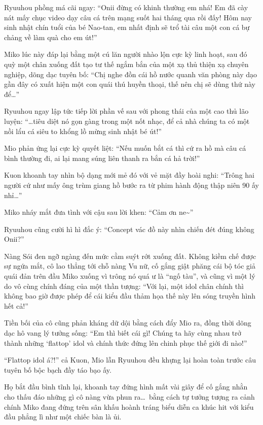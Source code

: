 \documentclass[../main.tex]{subfiles}
\begin{document}
Ryuuhou phồng má cãi ngay: ``Onii đừng có khinh thường em nhá! Em đã cày nát mấy chục video dạy câu cá trên mạng suốt hai tháng qua rồi đấy! Hôm nay sinh nhật chín tuổi của bé Nao-tan, em nhất định sẽ trổ tài câu một con cá bự chảng về làm quà cho em út!''

Miko lúc này đáp lại bằng một cú lăn người nhào lộn cực kỳ linh hoạt, sau đó quỳ một chân xuống đất tạo tư thế ngắm bắn của một xạ thủ thiện xạ chuyên nghiệp, dõng dạc tuyên bố: ``Chị nghe đồn cái hồ nước quanh văn phòng này dạo gần đây có xuất hiện một con quái thú huyền thoại, thế nên chị sẽ dùng thứ này để\dots''

Ryuuhou ngay lập tức tiếp lời phần vế sau với phong thái của một cao thủ lão luyện: ``\dots tiêu diệt nó gọn gàng trong một nốt nhạc, để cả nhà chúng ta có một nồi lẩu cá siêu to khổng lồ mừng sinh nhật bé út!''

Mio phản ứng lại cực kỳ quyết liệt: ``Nếu muốn bắt cá thì cứ ra hồ mà câu cá bình thường đi, ai lại mang súng liên thanh ra bắn cá hả trời!''

Kuon khoanh tay nhìn bộ dạng mới mẻ đó với vẻ mặt đầy hoài nghi: ``Trông hai người cứ như mấy ông trùm giang hồ bước ra từ phim hành động thập niên 90 ấy nhỉ\dots''

Miko nháy mắt đưa tình với cậu sau lời khen: ``Cảm ơn ne\~{}''

Ryuuhou cũng cười hì hì đắc ý: ``Concept vác đồ này nhìn chiến đét đúng không Onii?''

Nàng Sói đen ngỡ ngàng đến mức cằm suýt rớt xuống đất. Không kiềm chế được sự ngứa mắt, cô lao thẳng tới chỗ nàng Vu nữ, cố gắng giật phăng cái bộ tóc giả quái đản trên đầu Miko xuống vì trông nó quá ư là ``ngố tàu'', và cũng vì một lý do vô cùng chính đáng của một thần tượng: ``Với lại, một idol chân chính thì không bao giờ được phép để cái kiểu đầu thảm họa thế này lên sóng truyền hình hết cả!''


Tiền bối của cô cũng phản kháng dữ dội bằng cách đẩy Mio ra, đồng thời dõng dạc hô vang lý tưởng sống: ``Em thì biết cái gì! Chúng ta hãy cùng nhau trở thành những `flattop' idol và chính thức đứng lên chinh phục thế giới đi nào!''

``Flattop idol á?!'' cả Kuon, Mio lẫn Ryuuhou đều khựng lại hoàn toàn trước câu tuyên bố bộc bạch đầy táo bạo ấy.

Họ bắt đầu bình tĩnh lại, khoanh tay đứng hình mất vài giây để cố gắng nhằn cho thấu đáo những gì cô nàng vừa phun ra\dots\ bằng cách tự tưởng tượng ra cảnh chính Miko đang đứng trên sân khấu hoành tráng biểu diễn ca khúc hit với kiểu đầu phẳng lì như một chiếc bàn là ủi.
\end{document}
